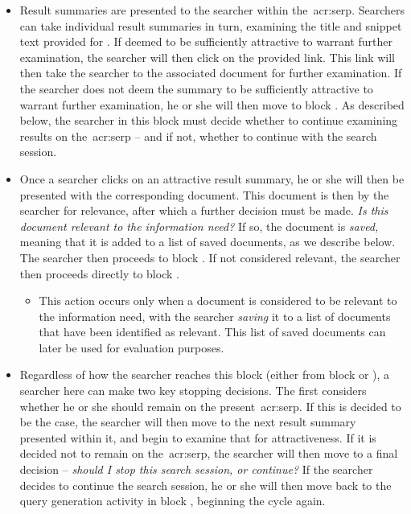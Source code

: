 \begin{itemize}
    \item[\blueboxbold{D}]{ Result summaries are presented to the searcher within the~\gls{acr:serp}. Searchers can take individual result summaries in turn, examining the title and snippet text provided for . If deemed to be sufficiently attractive to warrant further examination, the searcher will then click on the provided link. This link will then take the searcher to the associated document for further examination. If the searcher does not deem the summary to be sufficiently attractive to warrant further examination, he or she will then move to block . As described below, the searcher in this block must decide whether to continue examining results on the~\gls{acr:serp} -- and if not, whether to continue with the search session.}
    
    \item[\blueboxbold{E}]{ Once a searcher clicks on an attractive result summary, he or she will then be presented with the corresponding document. This document is then  by the searcher for relevance, after which a further decision must be made. \emph{Is this document relevant to the information need?} If so, the document is \emph{saved,} meaning that it is added to a list of saved documents, as we describe below. The searcher then proceeds to block . If not considered relevant, the searcher then proceeds directly to block .}
    
    \begin{itemize}
        \item{ This action occurs only when a document is considered to be relevant to the information need, with the searcher \emph{saving} it to a list of documents that have been identified as relevant. This list of saved documents can later be used for evaluation purposes.}
    \end{itemize}
    
    \item[\blueboxbold{F}]{ Regardless of how the searcher reaches this block (either from block  or ), a searcher here can make two key stopping decisions. The first considers whether he or she should remain on the present~\gls{acr:serp}. If this is decided to be the case, the searcher will then move to the next result summary presented within it, and begin to examine that for attractiveness. If it is decided not to remain on the~\gls{acr:serp}, the searcher will then move to a final decision -- \emph{should I stop this search session, or continue?} If the searcher decides to continue the search session, he or she will then move back to the query generation activity in block , beginning the cycle again.}
    
\end{itemize}

